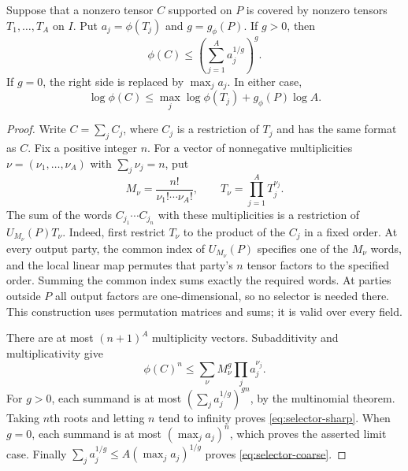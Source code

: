 \begin{lemma}\label{lem:terminal-selector}
Suppose that a nonzero tensor $C$ supported on $P$ is covered by nonzero tensors $T_1,\ldots,T_A$ on $I$. Put $a_j=\phi(T_j)$ and $g=g_\phi(P)$. If $g>0$, then
\begin{equation}\label{eq:selector-sharp}
 \phi(C)\leq\left(\sum_{j=1}^A a_j^{1/g}\right)^g.
\end{equation}
If $g=0$, the right side is replaced by $\max_j a_j$. In either case,
\begin{equation}\label{eq:selector-coarse}
 \log\phi(C)\leq\max_j\log\phi(T_j)+g_\phi(P)\log A.
\end{equation}
\end{lemma}
\begin{proof}
Write $C=\sum_j C_j$, where $C_j$ is a restriction of $T_j$ and has the same format as $C$. Fix a positive integer $n$. For a vector of nonnegative multiplicities $\nu=(\nu_1,\ldots,\nu_A)$ with $\sum_j\nu_j=n$, put
\[
 M_\nu=\frac{n!}{\nu_1!\cdots\nu_A!},\qquad
 T_\nu=\prod_{j=1}^A T_j^{\nu_j}.
\]
The sum of the words $C_{j_1}\cdots C_{j_n}$ with these multiplicities is a restriction of $U_{M_\nu}(P)T_\nu$. Indeed, first restrict $T_\nu$ to the product of the $C_j$ in a fixed order. At every output party, the common index of $U_{M_\nu}(P)$ specifies one of the $M_\nu$ words, and the local linear map permutes that party's $n$ tensor factors to the specified order. Summing the common index sums exactly the required words. At parties outside $P$ all output factors are one-dimensional, so no selector is needed there. This construction uses permutation matrices and sums; it is valid over every field.

There are at most $(n+1)^A$ multiplicity vectors. Subadditivity and multiplicativity give
\[
 \phi(C)^n\leq\sum_\nu M_\nu^g\prod_j a_j^{\nu_j}.
\]
For $g>0$, each summand is at most $(\sum_j a_j^{1/g})^{gn}$, by the multinomial theorem. Taking $n$th roots and letting $n$ tend to infinity proves \eqref{eq:selector-sharp}. When $g=0$, each summand is at most $(\max_j a_j)^n$, which proves the asserted limit case. Finally $\sum_j a_j^{1/g}\leq A(\max_j a_j)^{1/g}$ proves \eqref{eq:selector-coarse}.
\end{proof}

